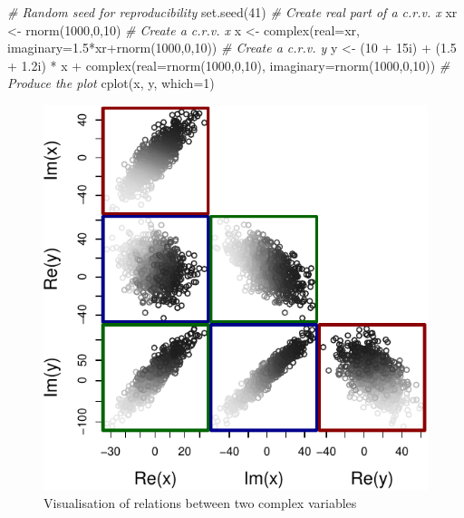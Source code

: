 \documentclass[
]{book}
\newenvironment{Shaded}{\begin{snugshade}}{\end{snugshade}}
\newcommand{\AttributeTok}[1]{\textcolor[rgb]{0.77,0.63,0.00}{#1}}
\newcommand{\CommentTok}[1]{\textcolor[rgb]{0.56,0.35,0.01}{\textit{#1}}}
\newcommand{\DecValTok}[1]{\textcolor[rgb]{0.00,0.00,0.81}{#1}}
\newcommand{\FloatTok}[1]{\textcolor[rgb]{0.00,0.00,0.81}{#1}}
\newcommand{\FunctionTok}[1]{\textcolor[rgb]{0.00,0.00,0.00}{#1}}
\newcommand{\NormalTok}[1]{#1}
\newcommand{\OtherTok}[1]{\textcolor[rgb]{0.56,0.35,0.01}{#1}}
\newcommand{\SpecialCharTok}[1]{\textcolor[rgb]{0.00,0.00,0.00}{#1}}
\begin{document}
\begin{Shaded}
\begin{Highlighting}[]
\CommentTok{\# Random seed for reproducibility}
\FunctionTok{set.seed}\NormalTok{(}\DecValTok{41}\NormalTok{)}
\CommentTok{\# Create real part of a c.r.v. x}
\NormalTok{xr }\OtherTok{\textless{}{-}} \FunctionTok{rnorm}\NormalTok{(}\DecValTok{1000}\NormalTok{,}\DecValTok{0}\NormalTok{,}\DecValTok{10}\NormalTok{)}
\CommentTok{\# Create a c.r.v. x}
\NormalTok{x }\OtherTok{\textless{}{-}} \FunctionTok{complex}\NormalTok{(}\AttributeTok{real=}\NormalTok{xr, }\AttributeTok{imaginary=}\FloatTok{1.5}\SpecialCharTok{*}\NormalTok{xr}\SpecialCharTok{+}\FunctionTok{rnorm}\NormalTok{(}\DecValTok{1000}\NormalTok{,}\DecValTok{0}\NormalTok{,}\DecValTok{10}\NormalTok{))}
\CommentTok{\# Create a c.r.v. y}
\NormalTok{y }\OtherTok{\textless{}{-}}\NormalTok{ (}\DecValTok{10} \SpecialCharTok{+}\NormalTok{ 15i) }\SpecialCharTok{+}\NormalTok{ (}\FloatTok{1.5} \SpecialCharTok{+} \FloatTok{1.2}\NormalTok{i) }\SpecialCharTok{*}\NormalTok{ x }\SpecialCharTok{+}
    \FunctionTok{complex}\NormalTok{(}\AttributeTok{real=}\FunctionTok{rnorm}\NormalTok{(}\DecValTok{1000}\NormalTok{,}\DecValTok{0}\NormalTok{,}\DecValTok{10}\NormalTok{), }\AttributeTok{imaginary=}\FunctionTok{rnorm}\NormalTok{(}\DecValTok{1000}\NormalTok{,}\DecValTok{0}\NormalTok{,}\DecValTok{10}\NormalTok{))}
\CommentTok{\# Produce the plot}
\FunctionTok{cplot}\NormalTok{(x, y, }\AttributeTok{which=}\DecValTok{1}\NormalTok{)}
\end{Highlighting}
\end{Shaded}

\begin{figure}
\centering
\includegraphics{Svetunkov---Svetunkov---Complex-Valued-Econometrics_files/figure-latex/crvScatterplots-1.pdf}
\caption{\label{fig:crvScatterplots}Visualisation of relations between two complex variables}
\end{figure}
\end{document}
